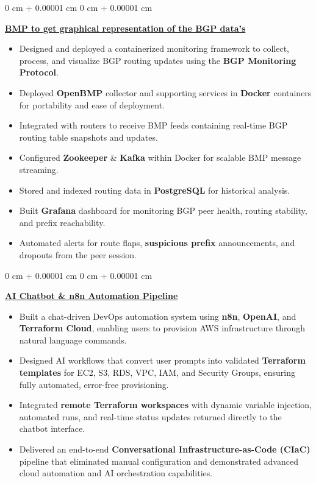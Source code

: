 \documentclass[10pt, letterpaper]{article}
\newenvironment{highlights}{
    \begin{itemize}[
        topsep=0.10 cm,
        parsep=0.10 cm,
        partopsep=0pt,
        itemsep=0pt,
        leftmargin=0 cm + 10pt
    ]
}{
    \end{itemize}
} %
\newenvironment{onecolentry}{
    \begin{adjustwidth}{
        0 cm + 0.00001 cm
    }{
        0 cm + 0.00001 cm
    }
}{
    \end{adjustwidth}
} %
\begin{document}
\begin{onecolentry}
    \textbf{\href{https://github.com/sayakr428/Implemented-BGP-monitoring-Protocol-to-get-graphical-representation-of-the-BGP-data-s}{BMP to get graphical representation of the BGP data’s}}
    \begin{highlights}
        \item Designed and deployed a containerized monitoring framework to collect, process, and visualize BGP routing updates using the \textbf{BGP Monitoring Protocol}.
        \item Deployed \textbf{OpenBMP} collector and supporting services in \textbf{Docker} containers for portability and ease of deployment.
        \item Integrated with routers to receive BMP feeds containing real‑time BGP routing table snapshots and updates.
        \item Configured \textbf{Zookeeper} \& \textbf{Kafka} within Docker for scalable BMP message streaming.
        \item Stored and indexed routing data in \textbf{PostgreSQL} for historical analysis.
        \item Built \textbf{Grafana} dashboard for monitoring BGP peer health, routing stability, and prefix reachability.
        \item Automated alerts for route flaps, \textbf{suspicious prefix} announcements, and dropouts from the peer session.
    \end{highlights}
\end{onecolentry}
\vspace{0.20cm}
\begin{onecolentry}
    \textbf{\href{https://github.com/sayakr428/cloud-butler-infra}{AI Chatbot \& n8n Automation Pipeline}}
    \begin{highlights}
        \item Built a chat-driven DevOps automation system using \textbf{n8n}, \textbf{OpenAI}, and \textbf{Terraform Cloud}, enabling users to provision AWS infrastructure through natural language commands.
        \item Designed AI workflows that convert user prompts into validated \textbf{Terraform templates} for EC2, S3, RDS, VPC, IAM, and Security Groups, ensuring fully automated, error-free provisioning.
        \item Integrated \textbf{remote Terraform workspaces} with dynamic variable injection, automated runs, and real-time status updates returned directly to the chatbot interface.
        \item Delivered an end-to-end \textbf{Conversational Infrastructure-as-Code (CIaC)} pipeline that eliminated manual configuration and demonstrated advanced cloud automation and AI orchestration capabilities.
    \end{highlights}
\end{onecolentry}
\end{document}
